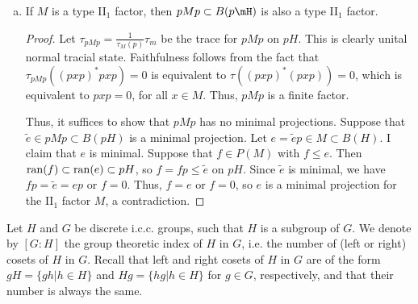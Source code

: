 \documentclass{article}
\begin{document}
\begin{enumerate}[(a)]
\item If $M$ is a type II$_1$ factor, then $pMp \subset B(p \mH)$ is also a type II$_1$ factor.
  \begin{proof}
    Let $\tau_{pMp} = \frac{1}{\tau_M(p)} \tau_m$ be the trace for $pMp$ on $pH$.  This is clearly
    unital normal tracial state.  Faithfulness follows from the fact that $\tau_{pMp}((pxp)^* pxp) = 0$
    is equivalent to $\tau((pxp)^*(pxp)) = 0$, which is equivalent to $pxp = 0$, for all $x \in M$.
    Thus, $pMp$ is a finite factor.

    Thus, it suffices to show that $pMp$ has no minimal projections.  Suppose that $\widetilde{e} \in pMp \subset B(pH)$ is a
    minimal projection.  Let $e = \widetilde{e} p \in M \subset B(H)$.  I claim that $e$ is minimal.  Suppose that $f \in P(M)$
    with $f \le e$. Then $\operatorname{ran}(f) \subset \operatorname{ran}(e) \subset pH$, so $f = fp \le \widetilde{e}$ on $pH$.  Since $\widetilde{e}$
    is minimal, we have $fp = \widetilde{e} = ep$ or $f = 0$.  Thus, $f = e$ or $f = 0$, so $e$ is a minimal projection for
    the II$_1$ factor $M$, a contradiction.
  \end{proof}
\end{enumerate}

 Let $ H $ and $ G $ be discrete i.c.c. groups, such that $ H $ is a subgroup of $ G $. We denote by $ [G:H] $ the group theoretic index of $ H $ in $ G $, i.e. the number of (left or right) cosets of $ H $ in $ G $. Recall that left and right cosets of $ H $ in $ G $ are of the form $ gH = \{gh| h \in H\} $ and $ Hg = \{hg| h \in H\} $ for $ g \in G $, respectively, and that their number is always the same.\\
	
\end{document}
